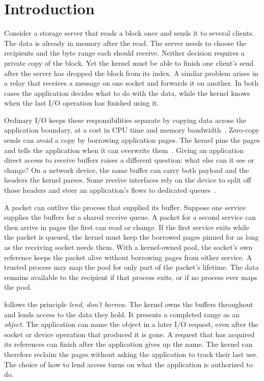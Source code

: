 \section{Introduction}
\label{sec:intro}

Consider a storage server that reads a block once and sends it to several
clients. The data is already in memory after the read. The server needs to
choose the recipients and the byte range each should receive. Neither decision
requires a private copy of the block. Yet the kernel must be able to finish one
client's send after the server has dropped the block from its index. A similar
problem arises in a relay that receives a message on one socket and forwards it
on another. In both cases the application decides what to do with the data, while
the kernel knows when the last I/O operation has finished using it.

Ordinary I/O keeps these responsibilities separate by copying data across the
application boundary, at a cost in CPU time and memory bandwidth~\cite{cai21,libra}.
Zero-copy sends can avoid a copy by borrowing application pages. The kernel pins
the pages and tells the application when it can overwrite them~\cite{msgzerocopy,sendzcdoc}.
Giving an application direct access to receive buffers raises a different
question: what else can it see or change? On a network device, the same buffer
can carry both payload and the headers the kernel parses. Some receive interfaces
rely on the device to split off those headers and steer an application's flows to
dedicated queues~\cite{zcrx,maio}.

A packet can outlive the process that supplied its buffer.
Suppose one service supplies the buffers for a shared receive queue. A packet
for a second service can then arrive in pages the first can read or change.
If the first service exits while the packet is queued, the kernel must keep
the borrowed pages pinned for as long as the receiving socket needs them.
With a kernel-owned pool, the socket's own reference keeps the packet alive
without borrowing pages from either service. A trusted process may map the
pool for only part of the packet's lifetime. The data remains available to
the recipient if that process exits, or if no process ever maps the pool.

\sys follows the principle \emph{lend, don't borrow}. The kernel owns the buffers
throughout and lends access to the data they hold. It presents a completed range
as an \emph{object}. The application can name the object in a later I/O request,
even after the socket or device operation that produced it is gone. A request
that has acquired its references can finish after the application gives up the
name. The kernel can therefore reclaim the pages without asking the application
to track their last use. The choice of how to lend access turns on what the
application is authorized to do.


